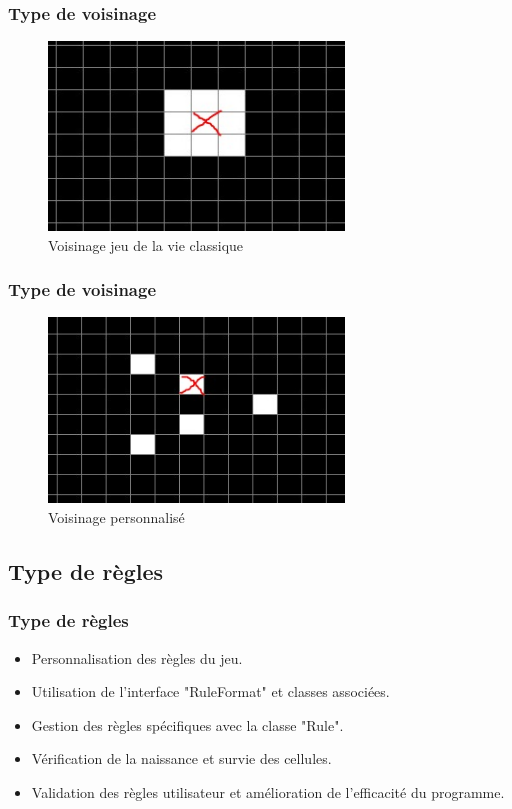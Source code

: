 \documentclass{beamer}
\begin{document}
\begin{frame}
  \frametitle{Type de voisinage}
 \begin{figure}
   \centering
   \includegraphics[width=0.7\textwidth]{voisinage_classique.jpeg}
   \caption{Voisinage jeu de la vie classique}
   \label{fig:Type de voisinage}
 \end{figure}
\end{frame}

\begin{frame}
  \frametitle{Type de voisinage}
 \begin{figure}
   \centering
   \includegraphics[width=0.7\textwidth]{voisinage_personnalise.jpeg}
   \caption{Voisinage personnalisé}
   \label{fig:Type de voisinage}
 \end{figure}
\end{frame}

\subsection{Type de règles}
\begin{frame}
  \frametitle{Type de règles}
  
 \begin{itemize}
 \item Personnalisation des règles du jeu.
 \item Utilisation de l'interface "RuleFormat" et classes associées.
 \item Gestion des règles spécifiques avec la classe "Rule".
 \item Vérification de la naissance et survie des cellules.
 \item Validation des règles utilisateur et amélioration de l'efficacité du programme.
 \end{itemize}
 
 
\end{frame}
\end{document}
